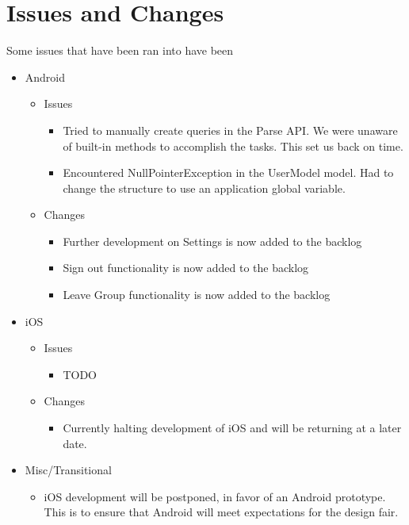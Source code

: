\documentclass[11pt]{article}
\begin{document}
\section*{Issues and Changes}
Some issues that have been ran into have been

	\begin{itemize}
		\item Android
			\begin{itemize}
				\item Issues
				\begin{itemize}
					\item Tried to manually create queries in the Parse API. We were unaware of built-in methods to accomplish the tasks. This set us back on time.
					\item Encountered NullPointerException in the UserModel model. Had to change the structure to use an application global variable.					
				\end{itemize}
				
				\item Changes
				\begin{itemize}
					\item Further development on Settings is now added to the backlog
					\item Sign out functionality is now added to the backlog
					\item Leave Group functionality is now added to the backlog			
				\end{itemize}
			\end{itemize}
		\item iOS
			\begin{itemize}
			\item Issues
				\begin{itemize}
				\item TODO
				\end{itemize}
			\item Changes
				\begin{itemize}
				\item Currently halting development of iOS and will be returning at a later date.
				\end{itemize}
			\end{itemize}
		\item Misc/Transitional
		\begin{itemize}
			\item iOS development will be postponed, in favor of an Android prototype. This is to ensure that Android will meet expectations for the design fair.
		\end{itemize}
	\end{itemize}
\end{document}
